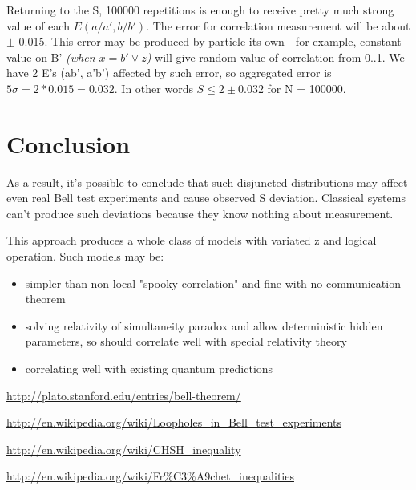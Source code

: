 \documentclass[a4paper]{article}
\begin{document}
Returning to the S, 100000 repetitions is enough to receive pretty much strong value of each $E(a/a', b/b')$. The error for correlation measurement will be about $\pm$ 0.015. This error may be produced by particle its own - for example, constant value on B' \textit{(when $x = b' \lor z$)} will give random value of correlation from 0..1. We have 2 E's (ab', a'b') affected by such error, so aggregated error is $5\sigma = 2* 0.015 = 0.032$. In other words $S \le 2 \pm 0.032$ for N = 100000. 

\hspace{0pt}


\section {Conclusion}

As a result, it's possible to conclude that such disjuncted distributions may affect even real Bell test experiments and cause observed S deviation. Classical systems can't produce such deviations because they know nothing about measurement.

This approach produces a whole class of models with variated z and logical operation. Such models may be:
\begin{itemize}
\item simpler than non-local "spooky correlation" and fine with no-communication theorem
\item solving relativity of simultaneity paradox and allow deterministic hidden parameters, so should correlate well with special relativity theory
\item correlating well with existing quantum predictions
\end{itemize}

\hspace{0pt}
\hspace{0pt}

\url{http://plato.stanford.edu/entries/bell-theorem/}

\url{http://en.wikipedia.org/wiki/Loopholes_in_Bell_test_experiments}

\url{http://en.wikipedia.org/wiki/CHSH_inequality}

\url{http://en.wikipedia.org/wiki/Fr%C3%A9chet_inequalities}
\end{document}
